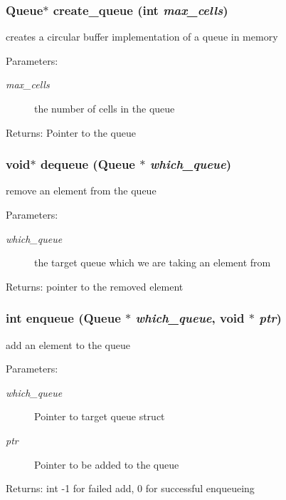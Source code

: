 \subsubsection{\setlength{\rightskip}{0pt plus 5cm}\bf{Queue}$\ast$ create\_\-queue (int {\em max\_\-cells})}\label{queue_8h_37f0ebf6bb3301f99bc42638a41ab12e}


creates a circular buffer implementation of a queue in memory \begin{Desc}
\item[Parameters:]
\begin{description}
\item[{\em max\_\-cells}]the number of cells in the queue \end{description}
\end{Desc}
\begin{Desc}
\item[Returns:]Pointer to the queue \end{Desc}
\subsubsection{\setlength{\rightskip}{0pt plus 5cm}void$\ast$ dequeue (\bf{Queue} $\ast$ {\em which\_\-queue})}\label{queue_8h_f8db386ebc4c0620589024d51d83f3b5}


remove an element from the queue \begin{Desc}
\item[Parameters:]
\begin{description}
\item[{\em which\_\-queue}]the target queue which we are taking an element from \end{description}
\end{Desc}
\begin{Desc}
\item[Returns:]pointer to the removed element \end{Desc}
\subsubsection{\setlength{\rightskip}{0pt plus 5cm}int enqueue (\bf{Queue} $\ast$ {\em which\_\-queue}, void $\ast$ {\em ptr})}\label{queue_8h_b5f34276406bb4ca11d16f5d4c608b33}


add an element to the queue \begin{Desc}
\item[Parameters:]
\begin{description}
\item[{\em which\_\-queue}]Pointer to target queue struct \item[{\em ptr}]Pointer to be added to the queue \end{description}
\end{Desc}
\begin{Desc}
\item[Returns:]int -1 for failed add, 0 for successful enqueueing \end{Desc}
